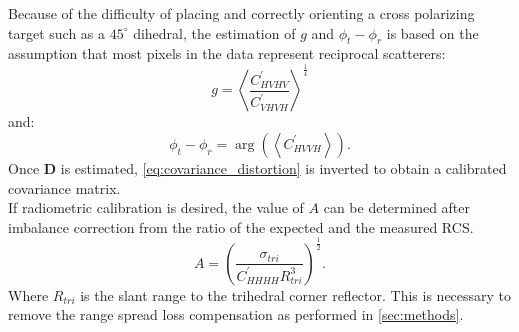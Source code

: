 Because of the difficulty of placing and correctly orienting a cross polarizing target such as a $45^\circ$ dihedral, the estimation of $g$ and $\phi_t - \phi_r$ is based on the assumption that most pixels in the data represent reciprocal scatterers:
\begin{equation}
	g = \left<\frac{C_{HVHV}^{\prime}}{C_{VHVH}^{\prime}}\right>^\frac{1}{4}
\end{equation}
and:
\begin{equation}
	\phi_t - \phi_r =\operatorname{arg}\left( \left<C_{HVVH}^{\prime}\right>\right).
\end{equation}
Once $\mathbf{D}$ is estimated, \autoref{eq:covariance_distortion} is inverted to obtain a calibrated covariance matrix.\\
If radiometric calibration is desired, the value of $A$ can be determined after imbalance correction from the ratio of the expected and the measured RCS.
\begin{equation}
	A =	\left(\frac{\sigma_{tri}}{C^{\prime}_{HHHH} R_{tri}^{3}}\right)^\frac{1}{2}.
\end{equation}
Where $R_{tri}$ is the slant range to the trihedral corner reflector. This is necessary to remove the range spread loss compensation as performed in \autoref{sec:methods}.
